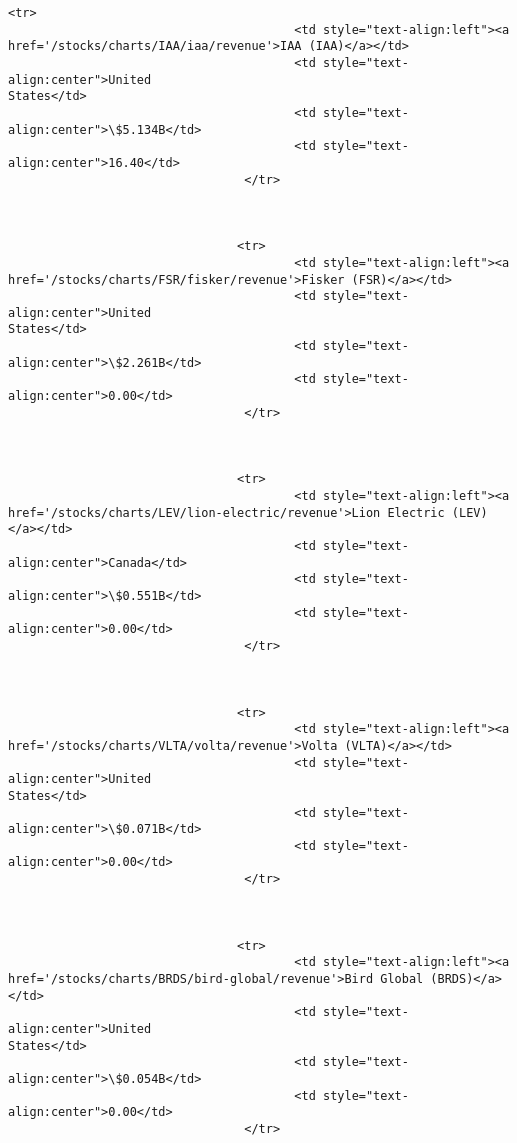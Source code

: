 \documentclass[11pt]{article}
\begin{document}
\begin{Verbatim}[commandchars=\\\{\}]
                                <tr>
                                        <td style="text-align:left"><a
href='/stocks/charts/IAA/iaa/revenue'>IAA (IAA)</a></td>
                                        <td style="text-align:center">United
States</td>
                                        <td style="text-
align:center">\$5.134B</td>
                                        <td style="text-align:center">16.40</td>
                                 </tr>



                                <tr>
                                        <td style="text-align:left"><a
href='/stocks/charts/FSR/fisker/revenue'>Fisker (FSR)</a></td>
                                        <td style="text-align:center">United
States</td>
                                        <td style="text-
align:center">\$2.261B</td>
                                        <td style="text-align:center">0.00</td>
                                 </tr>



                                <tr>
                                        <td style="text-align:left"><a
href='/stocks/charts/LEV/lion-electric/revenue'>Lion Electric (LEV)</a></td>
                                        <td style="text-
align:center">Canada</td>
                                        <td style="text-
align:center">\$0.551B</td>
                                        <td style="text-align:center">0.00</td>
                                 </tr>



                                <tr>
                                        <td style="text-align:left"><a
href='/stocks/charts/VLTA/volta/revenue'>Volta (VLTA)</a></td>
                                        <td style="text-align:center">United
States</td>
                                        <td style="text-
align:center">\$0.071B</td>
                                        <td style="text-align:center">0.00</td>
                                 </tr>



                                <tr>
                                        <td style="text-align:left"><a
href='/stocks/charts/BRDS/bird-global/revenue'>Bird Global (BRDS)</a></td>
                                        <td style="text-align:center">United
States</td>
                                        <td style="text-
align:center">\$0.054B</td>
                                        <td style="text-align:center">0.00</td>
                                 </tr>




\end{Verbatim}
\end{document}
